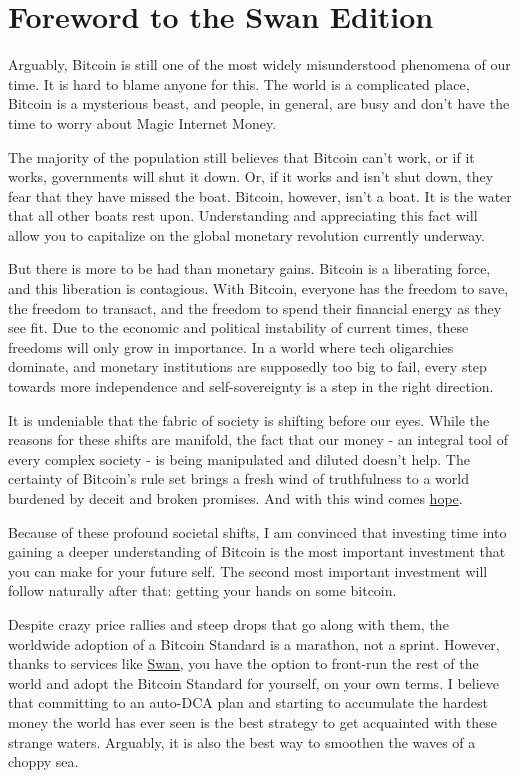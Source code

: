 \chapter*{Foreword to the Swan Edition}

Arguably, Bitcoin is still one of the most widely misunderstood phenomena of our
time. It is hard to blame anyone for this. The world is a complicated place,
Bitcoin is a mysterious beast, and people, in general, are busy and don't have
the time to worry about Magic Internet Money.

The majority of the population still believes that Bitcoin can't work, or if it
works, governments will shut it down. Or, if it works and isn't shut down, they
fear that they have missed the boat. Bitcoin, however, isn't a boat. It is the
water that all other boats rest upon. Understanding and appreciating this fact
will allow you to capitalize on the global monetary revolution currently
underway.

But there is more to be had than monetary gains. Bitcoin is a liberating force,
and this liberation is contagious. With Bitcoin, everyone has the freedom to
save, the freedom to transact, and the freedom to spend their financial energy
as they see fit. Due to the economic and political instability of current times,
these freedoms will only grow in importance. In a world where tech oligarchies
dominate, and monetary institutions are supposedly too big to fail, every step
towards more independence and self-sovereignty is a step in the right direction.

It is undeniable that the fabric of society is shifting before our eyes. While
the reasons for these shifts are manifold, the fact that our money - an integral
tool of every complex society - is being manipulated and diluted doesn't help.
The certainty of Bitcoin's rule set brings a fresh wind of truthfulness to a
world burdened by deceit and broken promises. And with this wind comes
\href{https://hope.com}{hope}.

Because of these profound societal shifts, I am convinced that investing time
into gaining a deeper understanding of Bitcoin is the most important investment
that you can make for your future self. The second most important investment
will follow naturally after that: getting your hands on some bitcoin.

Despite crazy price rallies and steep drops that go along with them, the
worldwide adoption of a Bitcoin Standard is a marathon, not a sprint. However,
thanks to services like \href{https://swanbitcoin.com}{Swan}, you have the
option to front-run the rest of the world and adopt the Bitcoin Standard for
yourself, on your own terms. I believe that committing to an auto-DCA plan and
starting to accumulate the hardest money the world has ever seen is the best
strategy to get acquainted with these strange waters. Arguably, it is also the
best way to smoothen the waves of a choppy sea.

